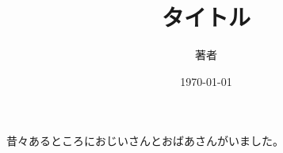\documentclass[a4paper,11pt]{jsarticle}
\begin{document}
\title{タイトル}
\author{著者}
\date{\today}
\maketitle
昔々あるところにおじいさんとおばあさんがいました。
\end{document}
